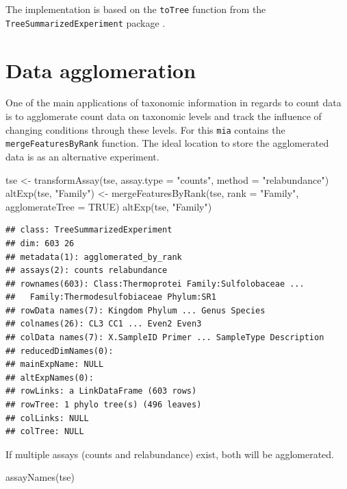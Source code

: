 \documentclass[
]{book}
\newenvironment{Shaded}{\begin{snugshade}}{\end{snugshade}}
\newcommand{\AttributeTok}[1]{\textcolor[rgb]{0.77,0.63,0.00}{#1}}
\newcommand{\ConstantTok}[1]{\textcolor[rgb]{0.00,0.00,0.00}{#1}}
\newcommand{\FunctionTok}[1]{\textcolor[rgb]{0.00,0.00,0.00}{#1}}
\newcommand{\NormalTok}[1]{#1}
\newcommand{\OtherTok}[1]{\textcolor[rgb]{0.56,0.35,0.01}{#1}}
\newcommand{\StringTok}[1]{\textcolor[rgb]{0.31,0.60,0.02}{#1}}
\begin{document}
The implementation is based on the \texttt{toTree} function from the
\texttt{TreeSummarizedExperiment} package \citep{R_TreeSummarizedExperiment}.

\hypertarget{data-agglomeration}{%
\section{Data agglomeration}\label{data-agglomeration}}

One of the main applications of taxonomic information in regards to count data
is to agglomerate count data on taxonomic levels and track the influence of
changing conditions through these levels. For this \texttt{mia} contains the
\texttt{mergeFeaturesByRank} function. The ideal location to store the agglomerated data
is as an alternative experiment.

\begin{Shaded}
\begin{Highlighting}[]
\NormalTok{tse }\OtherTok{\textless{}{-}} \FunctionTok{transformAssay}\NormalTok{(tse, }\AttributeTok{assay.type =} \StringTok{"counts"}\NormalTok{, }\AttributeTok{method =} \StringTok{"relabundance"}\NormalTok{)}
\FunctionTok{altExp}\NormalTok{(tse, }\StringTok{"Family"}\NormalTok{) }\OtherTok{\textless{}{-}} \FunctionTok{mergeFeaturesByRank}\NormalTok{(tse, }\AttributeTok{rank =} \StringTok{"Family"}\NormalTok{,}
                                           \AttributeTok{agglomerateTree =} \ConstantTok{TRUE}\NormalTok{)}
\FunctionTok{altExp}\NormalTok{(tse, }\StringTok{"Family"}\NormalTok{)}
\end{Highlighting}
\end{Shaded}

\begin{verbatim}
## class: TreeSummarizedExperiment 
## dim: 603 26 
## metadata(1): agglomerated_by_rank
## assays(2): counts relabundance
## rownames(603): Class:Thermoprotei Family:Sulfolobaceae ...
##   Family:Thermodesulfobiaceae Phylum:SR1
## rowData names(7): Kingdom Phylum ... Genus Species
## colnames(26): CL3 CC1 ... Even2 Even3
## colData names(7): X.SampleID Primer ... SampleType Description
## reducedDimNames(0):
## mainExpName: NULL
## altExpNames(0):
## rowLinks: a LinkDataFrame (603 rows)
## rowTree: 1 phylo tree(s) (496 leaves)
## colLinks: NULL
## colTree: NULL
\end{verbatim}

If multiple assays (counts and relabundance) exist, both will be agglomerated.

\begin{Shaded}
\begin{Highlighting}[]
\FunctionTok{assayNames}\NormalTok{(tse)}
\end{Highlighting}
\end{Shaded}
\end{document}
